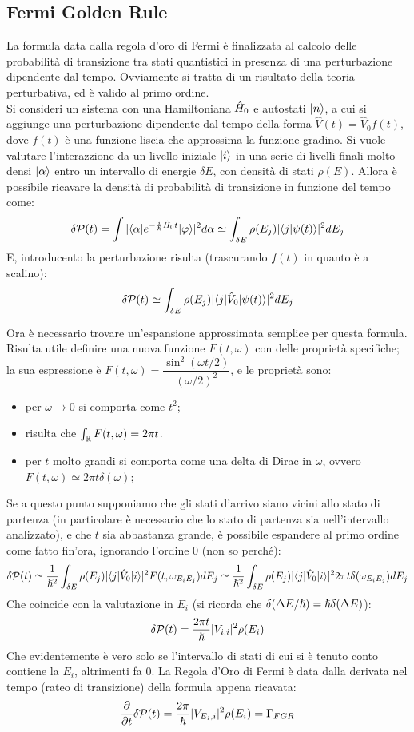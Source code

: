 \subsection{Fermi Golden Rule} 
La formula data dalla regola d'oro di Fermi è finalizzata al calcolo delle probabilità di transizione tra stati quantistici in presenza di una perturbazione dipendente dal tempo. Ovviamente si tratta di un risultato della teoria perturbativa, ed è valido al primo ordine. \\
Si consideri un sistema con una Hamiltoniana $\H_0$ e autostati $\Ket{n}$, a cui si aggiunge una perturbazione dipendente dal tempo della forma $\hat V(t) = \hat V_0 f(t)$, dove $f(t)$ è una funzione liscia che approssima la funzione gradino. Si vuole valutare l'interazzione da un livello iniziale $\Ket i$ in una serie di livelli finali molto densi $\Ket \alpha$ entro un intervallo di energie $\delta E$, con densità di stati $\rho(E)$. Allora è possibile ricavare la densità di probabilità di transizione in funzione del tempo come:
\[
	\delta \P(t) = \int |\Bra \alpha e^{-\frac{i}{\h} \H_0 t} \Ket \vphi|^2 d\alpha \simeq \int_{\delta E} \rho(E_j) |\braket j {\psi(t)}|^2 dE_j
\]
E, introducento la perturbazione risulta (trascurando $f(t)$ in quanto è a scalino):
\[
	\delta \P(t) \simeq \int_{\delta E} \rho(E_j) |\braketin{j}{\hat V_0}{\psi(t)}|^2 dE_j
\]

Ora è necessario trovare un'espansione approssimata semplice per questa formula. \\
Risulta utile definire una nuova funzione $F(t,\omega)$ con delle proprietà specifiche; la sua espressione è $F(t, \omega) = \dfrac{\sin^2(\omega t/2)}{(\omega/2)^2}$, e le proprietà sono:
\begin{itemize}
	\item per $\omega \rightarrow 0$ si comporta come $t^2$;
	\item risulta che $\rint F(t,\omega) = 2\pi t$.
	\item per $t$ molto grandi si comporta come una delta di Dirac in $\omega$, ovvero $F(t,\omega) \simeq 2\pi t\delta(\omega)$;
\end{itemize}

Se a questo punto supponiamo che gli stati d'arrivo siano vicini allo stato di partenza (in particolare è necessario che lo stato di partenza sia nell'intervallo analizzato), e che $t$ sia abbastanza grande, è possibile espandere al primo ordine come fatto fin'ora, ignorando l'ordine 0 (non so perché):
\[
	\delta \P(t) \simeq \frac{1}{\hslash^2} \int_{\delta E} \rho(E_j) |\Bra j \hat V_0  \Ket {i}|^2F(t, \omega_{E_iE_j}) dE_j \simeq \frac{1}{\hslash^2} \int_{\delta E} \rho(E_j) |\Bra j \hat V_0  \Ket {i}|^2 2\pi t\delta (\omega_{E_iE_j}) dE_j
\]
Che coincide con la valutazione in $E_i$ (si ricorda che $\delta(\Delta E/\h) = \h \delta(\Delta E)$):
\[
	\delta \P(t) = \frac{2 \pi t}{\h} |V_{i, i}|^2 \rho(E_i)
\]
Che evidentemente è vero solo se l'intervallo di stati di cui si è tenuto conto contiene la $E_i$, altrimenti fa 0. La Regola d'Oro di Fermi è data dalla derivata nel tempo (rateo di transizione) della formula appena ricavata:
\[
	\tderiv{}\delta \P(t) = \frac{2 \pi}{\h} |V_{E_i, i}|^2 \rho(E_i) = \Gamma_{FGR}
\]


